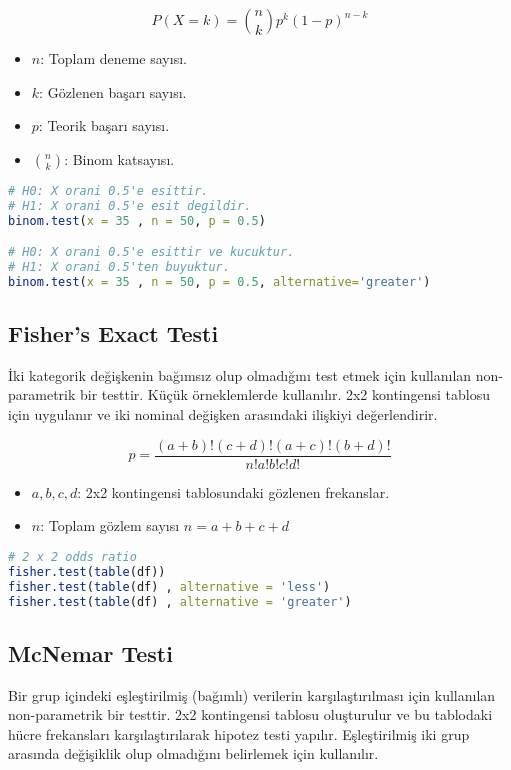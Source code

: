 \[ P(X = k) = \binom{n}{k} p^k (1 - p)^{n - k} \]

\begin{itemize}
	\item $n$: Toplam deneme sayısı.
	\item $k$: Gözlenen başarı sayısı.
	\item $p$: Teorik başarı sayısı.
	\item $\binom{n}{k}$: Binom katsayısı.
\end{itemize}

\begin{lstlisting}[language=R]
# H0: X orani 0.5'e esittir.
# H1: X orani 0.5'e esit degildir.
binom.test(x = 35 , n = 50, p = 0.5)

# H0: X orani 0.5'e esittir ve kucuktur.
# H1: X orani 0.5'ten buyuktur.
binom.test(x = 35 , n = 50, p = 0.5, alternative='greater')
\end{lstlisting}

\newpage

\subsection{Fisher's Exact Testi}
İki kategorik değişkenin bağımsız olup olmadığını test etmek için kullanılan non-parametrik bir testtir. Küçük örneklemlerde kullanılır. 2x2 kontingensi tablosu için uygulanır ve iki nominal değişken arasındaki ilişkiyi değerlendirir.

\[ p = \frac{(a+b)!(c+d)!(a+c)!(b+d)!}{n!a!b!c!d!} \]

\begin{itemize}
	\item $a,b,c,d$: 2x2 kontingensi tablosundaki gözlenen frekanslar.
	\item $n$: Toplam gözlem sayısı $n = a + b + c + d$
\end{itemize}

\begin{lstlisting}[language=R]
# 2 x 2 odds ratio
fisher.test(table(df))
fisher.test(table(df) , alternative = 'less')
fisher.test(table(df) , alternative = 'greater')
\end{lstlisting}

\newpage

\subsection{McNemar Testi}
Bir grup içindeki eşleştirilmiş (bağımlı) verilerin karşılaştırılması için kullanılan non-parametrik bir testtir. 2x2 kontingensi tablosu oluşturulur ve bu tablodaki hücre frekansları karşılaştırılarak hipotez testi yapılır. Eşleştirilmiş iki grup arasında değişiklik olup olmadığını belirlemek için kullanılır.

